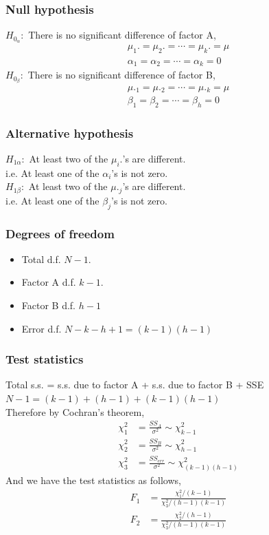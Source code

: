 \documentclass[oneside,11pt,pdftex]{book}%
\numberwithin{equation}{section}
\numberwithin{section}{chapter}
\numberwithin{equation}{chapter}
\begin{document}
\subsubsection{Null hypothesis}
$ H_{0_{\alpha}}: $ There is no significant difference of factor A,
\begin{align*}
	\mu_1.=\mu_2.=\cdots=\mu_k.=\mu\\
	\alpha_1=\alpha_2=\cdots=\alpha_k=0
\end{align*}
$ H_{0_{\beta}}: $ There is no significant difference of factor B,
\begin{align*}
	\mu._1=\mu._2=\cdots=\mu._k=\mu\\
	\beta_1=\beta_2=\cdots=\beta_h=0
\end{align*}

\subsubsection{Alternative hypothesis}
$ H_{1 \alpha } :$ At least two of the $ \mu_i. $'s are different.\\
i.e. At least one of the $ \alpha_i  $'s is not zero.\\
$ H_{1 \beta } :$ At least two of the $ \mu._j $'s are different.\\
i.e. At least one of the $ \beta_j  $'s is not zero.

\subsubsection{Degrees of freedom}
\begin{itemize}
	\item Total d.f. $ N-1 $.
	\item Factor A d.f. $k-1$.
	\item Factor B d.f. $h-1$
	\item Error d.f. $N-k-h+1=(k-1)(h-1)$
\end{itemize}

\subsubsection{Test statistics}

Total s.s. = s.s. due to factor A + s.s. due to factor B + SSE
$ N-1=(k-1)+(h-1)+(k-1)(h-1) $\\

Therefore by Cochran's theorem,
\begin{align*}
	\chi_1^2&=\frac{SS_A}{\sigma^2}\sim \chi^2_{k-1}\\
	\chi_2^2&=\frac{SS_B}{\sigma^2} \sim \chi^2_{h-1}\\
	\chi_3^2&=\frac{SS_{err}}{\sigma^2} \sim \chi^2_{(k-1)(h-1)}
\end{align*}
And we have the test statistics as follows,
\begin{align*}
	F_1&=\frac{\chi_1^2/(k-1)}{\chi^2_3/(h-1)(k-1)}\\
	F_2&=\frac{\chi_2^2/(h-1)}{\chi_3^2/(h-1)(k-1)}
\end{align*}
\end{document}
